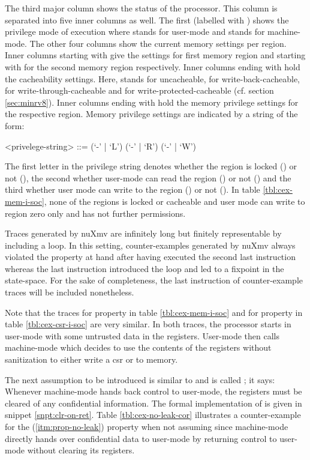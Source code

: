 The third major column shows the status of the processor.
This column is separated into five inner columns as well.
The first (labelled with ) shows the privilege mode of execution where  stands for user-mode and  stands for machine-mode.
The other four columns show the current memory settings per region.
Inner columns starting with  give the settings for first memory region and starting with  for the second memory region respectively.
Inner columns ending with  hold the cacheability settings.
Here,  stands for uncacheable,  for write-back-cacheable,  for write-through-cacheable and  for write-protected-cacheable (cf. section \ref{sec:minrv8}).
Inner columns ending with  hold the memory privilege settings for the respective region.
Memory privilege settings are indicated by a string of the form:
\begin{grammar}
    <privelege-string> ::= (`-' | `L') (`-' | `R') (`-' | `W')
\end{grammar}

The first letter in the privilege string denotes whether the region is locked () or not (\minrv{-}), the second whether user-mode can read the region () or not (\minrv{-}) and the third whether user mode can write to the region () or not (\minrv{-}).
In table \ref{tbl:cex-mem-i-soc}, none of the regions is locked or cacheable and user mode can write to region zero only and has not further permissions.

Traces generated by nuXmv are infinitely long but finitely representable by including a loop.
In this setting, counter-examples generated by nuXmv always violated the property at hand after having executed the second last instruction whereas the last instruction introduced the loop and led to a fixpoint in the state-space.
For the sake of completeness, the last instruction of counter-example traces will be included nonetheless.

Note that the traces for property  in table \ref{tbl:cex-mem-i-soc} and for property  in table \ref{tbl:cex-csr-i-soc} are very similar.
In both traces, the processor starts in user-mode with some untrusted data in the registers.
User-mode then calls machine-mode which decides to use the contents of the registers without sanitization to either write a \gls{csr} or to memory.

The next assumption to be introduced is similar to  and is called ; it says: Whenever machine-mode hands back control to user-mode, the registers must be cleared of any confidential information.
The formal implementation of  is given in snippet \ref{snpt:clr-on-ret}.
Table \ref{tbl:cex-no-leak-cor} illustrates a counter-example for the  (\ref{itm:prop-no-leak}) property when not assuming  since machine-mode directly hands over confidential data to user-mode by returning control to user-mode without clearing its registers.

